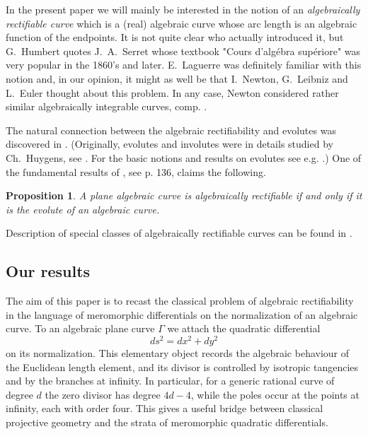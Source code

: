 \documentclass[reqno]{amsart}
\newtheorem{proposition}[theorem]{Proposition}
\theoremstyle{definition}
\theoremstyle{remark}
\theoremstyle{definition}
\theoremstyle{definition}
\theoremstyle{definition}
\begin{document}
 In the present paper we will mainly be interested in  the notion of an \emph{algebraically rectifiable curve} which is a (real) algebraic curve whose arc length  is an algebraic function of the endpoints. It is not quite clear who actually introduced it, but G.~Humbert \cite{Hu} quotes  J.~A.~Serret whose textbook "Cours d'alg\'ebra sup\'eriore" was very popular in the 1860's and later.
E.~Laguerre was definitely familiar with this notion and, in our opinion, it might as well be that I.~Newton, G.~Leibniz and L.~Euler thought about this problem.  In any case, Newton considered rather similar  algebraically integrable curves, comp. \cite{AV}.

The natural connection between the algebraic rectifiability and  evolutes was discovered in \cite {Hu}. (Originally, evolutes and involutes were in details studied by Ch.~Huygens, see \cite {Huy}. For the basic notions and results on evolutes see e.g. \cite {Hi}.) One of the fundamental results of \cite {Hu}, see p. 136, claims the following.

\begin{proposition}\label{prop:Hu} A plane algebraic curve is algebraically rectifiable if and only if it is the evolute of an algebraic curve.
\end{proposition}

Description of special classes of algebraically rectifiable curves can be found in  \cite{SaFa}. %



\medskip
\noindent

\subsection{Our results}
The aim of this paper is to recast the classical problem of algebraic
rectifiability in the language of meromorphic differentials on the
normalization of an algebraic curve.  To an algebraic plane curve
$\Gamma$ we attach the quadratic differential
\[
        ds^2=dx^2+dy^2
\]
on its normalization.  This elementary object records the algebraic
behaviour of the Euclidean length element, and its divisor is controlled by
isotropic tangencies and by the branches at infinity.  In particular, for a
generic rational curve of degree $d$ the zero divisor has degree $4d-4$,
while the poles occur at the points at infinity, each with order four.
This gives a useful bridge between classical projective geometry and the
strata of meromorphic quadratic differentials.
\end{document}

